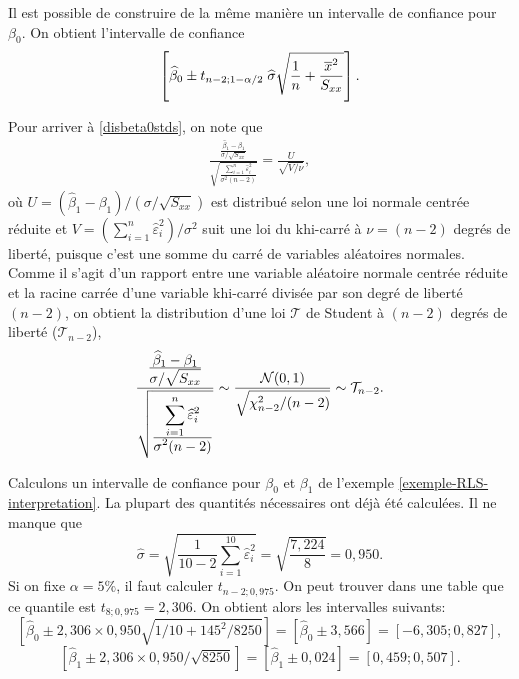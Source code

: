  Il est possible de construire de la même manière un intervalle de confiance pour $\beta_0$. On obtient l'intervalle de confiance 
 \begin{eqnarray}
\left[\widehat{\beta}_0\pm t_{n-2; 1-\alpha/2}\; \widehat\sigma\sqrt{{1\over n}+{\overline{x}^2\over S_{xx}}}\right].
\label{ci:beta0}
\end{eqnarray}

\vspace{0.05in}
\begin{remarque}
Pour arriver à \eqref{disbeta0stds}, on note que
\begin{eqnarray*}
 \frac{\frac{\displaystyle\widehat{\beta}_1-\beta_1}{\displaystyle\sigma/\sqrt{S_{xx}}}}{\sqrt{\frac{\displaystyle\sum_{i=1}^n \widehat{\varepsilon}_i^2}{\displaystyle\sigma^2 (n-2)}}}=\frac{U}{\sqrt{V/\nu}},
\end{eqnarray*}
où $U=\left(\widehat{\beta}_1-\beta_1\right) \big/ \left(\sigma/\sqrt{S_{xx}}\right)$ est distribué selon une loi normale centrée réduite et $V= \left(\sum_{i=1}^n \widehat{\varepsilon}_i^2 \right)\big/ \sigma^2$ suit une loi du khi-carré à $\nu=(n-2)$ degrés de liberté, puisque c'est une somme du carré de variables aléatoires normales.
Comme il s'agit d'un rapport entre une variable aléatoire normale centrée réduite et la racine carrée d'une variable khi-carré divisée par son degré de liberté  $(n-2)$, on obtient la distribution d'une loi $\mathcal{T}$ de Student à $(n-2)$ degrés de liberté ($\mathcal{T}_{n-2}$),
\begin{eqnarray*}
 \frac{\frac{\displaystyle\widehat{\beta}_1-\beta_1}{\displaystyle\sigma/\sqrt{S_{xx}}}}{\sqrt{\frac{\displaystyle\sum_{i=1}^n \widehat{\varepsilon}_i^2}{\displaystyle\sigma^2 (n-2)}}} \sim \frac{\mathcal{N}(0,1)}{\sqrt{\chi_{n-2}^2/(n-2)}} \sim \mathcal{T}_{n-2}.
 \end{eqnarray*}
\end{remarque}


\begin{exemple}
\label{exp:int_beta}
Calculons un intervalle de confiance pour $\beta_0$ et $\beta_1$ de l'exemple \ref{exemple-RLS-interpretation}. La plupart des quantités nécessaires ont déjà été calculées. Il ne manque que
$$\widehat\sigma=\sqrt{\frac{1}{10-2} \sum_{i=1}^{10}\widehat\varepsilon_i^2}=\sqrt{\frac{7,224}{8}}=0,950.$$
Si on fixe $\alpha=5\%$, il faut calculer $t_{n-2; 0,975}$. On peut trouver dans une table que ce quantile est  $t_{8;0,975}=2,306$. On obtient alors les intervalles suivants:
$$\left[\widehat{\beta}_0\pm 2,306\times0,950\sqrt{1/10+145^2/8250} \right]=\left[\widehat{\beta}_0\pm 3,566\right]=\left[-6,305;0,827\right],$$
$$\left[\widehat{\beta}_1\pm 2,306\times 0,950/\sqrt{8250}\right]=\left[\widehat{\beta}_1\pm 0,024\right]=[0,459;0,507].$$
\end{exemple}


